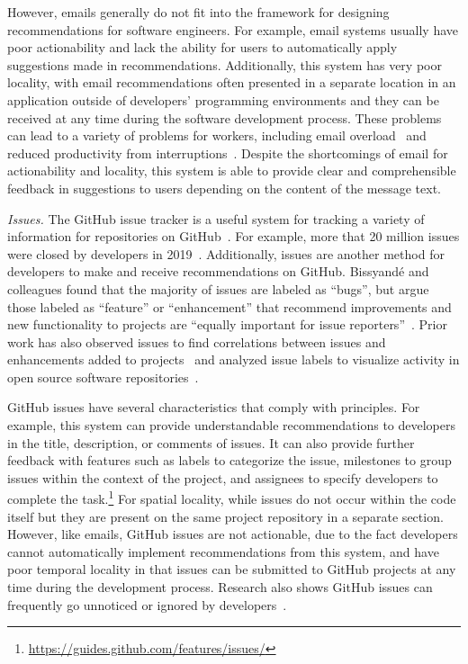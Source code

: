 However, emails generally do not fit into the \framework framework for designing recommendations for software engineers. For example, email systems usually have poor actionability and lack the ability for users to automatically apply suggestions made in recommendations. Additionally, this system has very poor locality, with email recommendations often presented in a separate location in an application outside of developers' programming environments and they can be received at any time during the software development process. These problems can lead to a variety of problems for workers, including email overload~\cite{Dabbish2006EmailOverload} and reduced productivity from interruptions~\cite{jackson2001cost}. Despite the shortcomings of email for actionability and locality, this system is able to provide clear and comprehensible feedback in suggestions to users depending on the content of the message text.

\textit{Issues.} The GitHub issue tracker is a useful system for tracking a variety of information for repositories on GitHub~\cite{Issues}. For example, more that 20 million issues were closed by developers in 2019~\cite{Octoverse}. Additionally, issues are another method for developers to make and receive recommendations on GitHub. Bissyandé and colleagues found that the majority of issues are labeled as ``bugs'', but argue those labeled as ``feature'' or ``enhancement'' that recommend improvements and new functionality to projects are ``equally important for issue reporters''~\cite{bissyande2013issues}. Prior work has also observed issues to find correlations between issues and enhancements added to projects~\cite{krishna2018connection} and analyzed issue labels to visualize activity in open source software repositories~\cite{izquierdo2015gila}.

GitHub issues have several characteristics that comply with \framework principles. For example, this system can provide understandable recommendations to developers in the title, description, or comments of issues. It can also provide further feedback with features such as labels to categorize the issue, milestones to group issues within the context of the project, and assignees to specify developers to complete the task.\footnote{\url{https://guides.github.com/features/issues/}} For spatial locality, while issues do not occur within the code itself but they are present on the same project repository in a separate section. However, like emails, GitHub issues are not actionable, due to the fact developers cannot automatically implement recommendations from this system, and have poor temporal locality in that issues can be submitted to GitHub projects at any time during the development process. Research also shows GitHub issues can frequently go unnoticed or ignored by developers~\cite{sorbo2019wontfix}.

